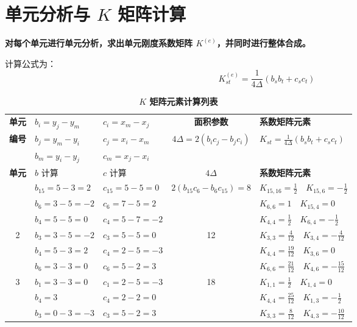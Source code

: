 \documentclass[a4paper, 12pt]{article}
\begin{document}
\section{单元分析与 $K$ 矩阵计算}

\textbf{对每个单元进行单元分析，求出单元刚度系数矩阵 $K^{(e)}$，并同时进行整体合成。}

计算公式为：
\[
K_{st}^{(e)} = \frac{1}{4\Delta} (b_s b_t + c_s c_t)
\]

\begin{longtable}{|c|l|l|c|l|}
\caption{\textbf{ $K$ 矩阵元素计算列表}} \\
\hline
\textbf{单元} & $b_i = y_j - y_m$ & $c_i = x_m - x_j$ & \textbf{面积参数} & \textbf{系数矩阵元素} \\
\textbf{编号} & $b_j = y_m - y_i$ & $c_j = x_i - x_m$ & $4\Delta = 2(b_i c_j - b_j c_i)$ & $K_{st} = \frac{1}{4\Delta}(b_s b_t + c_s c_t)$ \\
 & $b_m = y_i - y_j$ & $c_m = x_j - x_i$ & & \\
\hline
\endfirsthead
\hline
\textbf{单元} & $b$ 计算 & $c$ 计算 & $4\Delta$ & \textbf{系数矩阵元素} \\
\hline
\endhead
\hline
\endfoot

\multirow{3}{*}{1} & $b_{15}=5-3=2$ & $c_{15}=5-5=0$ & \multirow{3}{*}{$2(b_{15}c_6 - b_6 c_{15}) = 8$} & $K_{15,16} = \frac{1}{2} \quad K_{15,6} = -\frac{1}{2}$ \\
 & $b_6=3-5=-2$ & $c_6=7-5=2$ & & $K_{6,6}=1 \quad K_{15,4}=0$ \\
 & $b_4=5-5=0$ & $c_4=5-7=-2$ & & $K_{4,4}=\frac{1}{2} \quad K_{6,4} = -\frac{1}{2}$ \\
\hline

\multirow{3}{*}{2} & $b_3=3-5=-2$ & $c_3=5-5=0$ & \multirow{3}{*}{12} & $K_{3,3}=\frac{4}{12} \quad K_{3,4} = -\frac{4}{12}$ \\
 & $b_4=5-3=2$ & $c_4=2-5=-3$ & & $K_{4,4}=\frac{19}{12} \quad K_{3,6}=0$ \\
 & $b_6=3-3=0$ & $c_6=5-2=3$ & & $K_{6,6}=\frac{21}{12} \quad K_{4,6} = -\frac{15}{12}$ \\
\hline

\multirow{3}{*}{3} & $b_1=3-3=0$ & $c_1=2-5=-3$ & \multirow{3}{*}{18} & $K_{1,1}=\frac{1}{2} \quad K_{1,4}=0$ \\
 & $b_4=3$ & $c_4=2-2=0$ & & $K_{4,4}=\frac{25}{12} \quad K_{1,3} = -\frac{1}{2}$ \\
 & $b_3=0-3=-3$ & $c_3=5-2=3$ & & $K_{3,3}=\frac{8}{12} \quad K_{4,3} = -\frac{10}{12}$ \\
\hline


\end{longtable}
\end{document}

